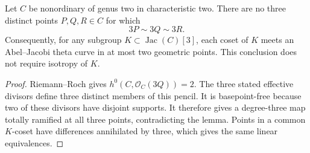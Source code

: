 \begin{corollary}
\label{cor:nonordinary-genus-two-no-three-torsion-triple-candidate}
Let $C$ be nonordinary of genus two in characteristic two. There
are no three distinct points $P,Q,R\in C$ for which
\[
                         3P\sim3Q\sim3R.
\]
Consequently, for any subgroup $K\subset\operatorname{Jac}(C)[3]$,
each coset of $K$ meets an Abel--Jacobi theta curve in at most two
geometric points. This conclusion does not require isotropy of $K$.
\end{corollary}
\begin{proof}
Riemann--Roch gives $h^0(C,\mathcal O_C(3Q))=2$. The three stated
effective divisors define three distinct members of this pencil.
It is basepoint-free because two of these divisors have disjoint
supports. It therefore gives a degree-three map totally ramified
at all three points, contradicting the lemma. Points in a common
$K$-coset have differences annihilated by three, which gives the
same linear equivalences.
\end{proof}

